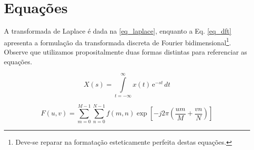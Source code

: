 \begin{apendicesenv}
\begin{figure}[!htb]
{        }\hspace{2ex} %
        \label{fig_figura_exemplo2}
    \end{figure}

    \section{Equações}
    \label{sec_equacoes}

    A transformada de Laplace é dada na \autoref{eq_laplace}, enquanto a Eq. \ref{eq_dft} apresenta a formulação da transformada discreta de Fourier bidimensional\footnote{Deve-se reparar na formatação esteticamente perfeita destas equações.}.
    Observe que utilizamos propositalmente duas formas distintas para referenciar as equações.

    \begin{equation}
        X(s) = \int\limits_{t = -\infty}^{\infty} x(t) \, \text{e}^{-st} \, dt
        \label{eq_laplace}
    \end{equation}

    \begin{equation}
        F(u, v) = \sum_{m = 0}^{M - 1} \sum_{n = 0}^{N - 1} f(m, n) \exp \left[ -j 2 \pi \left( \frac{u m}{M} + \frac{v n}{N} \right) \right]
        \label{eq_dft}
    \end{equation}


\end{apendicesenv}
